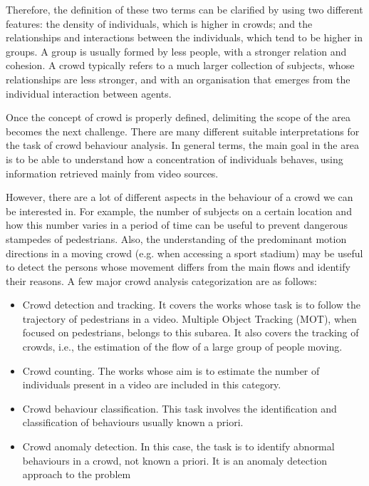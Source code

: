 \documentclass{fisatprojectfinal}
\begin{document}
Therefore, the definition of these two terms can be clarified by using two different features: the density of individuals, which is higher in crowds; and the relationships and interactions between the individuals, which tend to be higher in groups. A group is usually formed by less people, with a stronger relation and cohesion. A crowd typically refers to a much larger collection of subjects, whose relationships are less stronger, and with an organisation that emerges from the individual interaction between agents.

Once the concept of crowd is properly defined, delimiting the scope of the area becomes the next challenge. There are many different suitable interpretations for the task of crowd behaviour analysis. In general terms, the main goal in the area is to be able to understand how a concentration of individuals behaves, using information retrieved mainly from video sources. 

However, there are a lot of different aspects in the behaviour of a crowd we can be interested in. For example, the number of subjects on a certain location and how this number varies in a period of time can be useful to prevent dangerous stampedes of pedestrians. Also, the understanding of the predominant motion directions in a moving crowd (e.g. when accessing a sport stadium) may be useful to detect the persons whose movement differs from the main flows and identify their reasons. A few major crowd analysis categorization are as follows:

\begin{itemize}
  \item Crowd detection and tracking. It covers the works whose task is to follow the trajectory of pedestrians in a video. Multiple Object Tracking (MOT), when focused on pedestrians, belongs to this subarea. It also covers the tracking of crowds, i.e., the estimation of the flow of a large group of people moving.
  \item Crowd counting. The works whose aim is to estimate the number of individuals present in a video are included in this category.
  \item Crowd behaviour classification. This task involves the identification and classification of behaviours usually known a priori.
  \item Crowd anomaly detection. In this case, the task is to identify abnormal behaviours in a crowd, not known a priori. It is an anomaly detection approach to the problem
\end{itemize}
\end{document}
